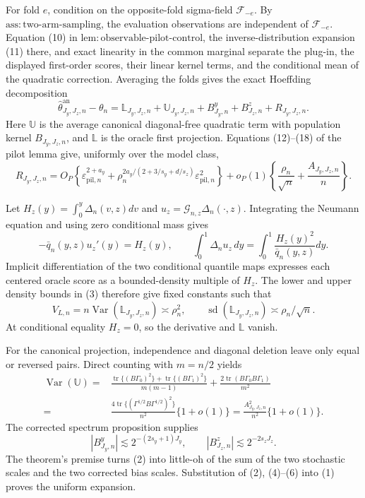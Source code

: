 For fold \(e\), condition on the opposite-fold sigma-field \(\mathscr F_{-e}\). By \(\mathrm{ass{:}two\text{-}arm\text{-}sampling}\), the evaluation observations are independent of \(\mathscr F_{-e}\). Equation (10) in \(\mathrm{lem{:}observable\text{-}pilot\text{-}control}\), the inverse-distribution expansion (11) there, and exact linearity in the common marginal separate the plug-in, the displayed first-order scores, their linear kernel terms, and the conditional mean of the quadratic correction. Averaging the folds gives the exact Hoeffding decomposition
\[
\widehat\theta^{\mathrm{an}}_{J_y,J_z,n}-\theta_n
=\mathbb L_{J_y,J_z,n}+\mathbb U_{J_y,J_z,n}
+B^y_{J_y,n}+B^z_{J_z,n}+R_{J_y,J_z,n}.                          \tag{1}
\]
Here \(\mathbb U\) is the average canonical diagonal-free quadratic term with population kernel \(B_{J_y,J_z,n}\), and \(\mathbb L\) is the oracle first projection. Equations (12)--(18) of the pilot lemma give, uniformly over the model class,
\[
R_{J_y,J_z,n}
=O_P\!\left\{\varepsilon_{\mathrm{pil},n}^{2+a_y}
+\rho_n^{2a_y/(2+3/s_y+d/s_z)}\varepsilon_{\mathrm{pil},n}^2\right\}
+o_P(1)\left\{\frac{\rho_n}{\sqrt n}+\frac{A_{J_y,J_z,n}}n\right\}. \tag{2}
\]

Let \(H_z(y)=\int_0^y\Delta_n(v,z)dv\) and \(u_z=\mathcal G_{n,z}\Delta_n(\cdot,z)\). Integrating the Neumann equation and using zero conditional mass gives
\[
-\bar q_n(y,z)u_z'(y)=H_z(y),
\qquad
\int_0^1\Delta_nu_z\,dy=\int_0^1\frac{H_z(y)^2}{\bar q_n(y,z)}dy. \tag{3}
\]
Implicit differentiation of the two conditional quantile maps expresses each centered oracle score as a bounded-density multiple of \(H_z\). The lower and upper density bounds in (3) therefore give fixed constants such that
\[
V_{L,n}=n\operatorname{Var}(\mathbb L_{J_y,J_z,n})\asymp\rho_n^2,
\qquad
\operatorname{sd}(\mathbb L_{J_y,J_z,n})\asymp\rho_n/\sqrt n.   \tag{4}
\]
At conditional equality \(H_z=0\), so the derivative and \(\mathbb L\) vanish.

For the canonical projection, independence and diagonal deletion leave only equal or reversed pairs. Direct counting with \(m=n/2\) yields
\[
\begin{split}
\operatorname{Var}(\mathbb U)
={}&\frac{\operatorname{tr}\{(B\Gamma_0)^2\}+\operatorname{tr}\{(B\Gamma_1)^2\}}{m(m-1)}
+\frac{2\operatorname{tr}(B\Gamma_0B\Gamma_1)}{m^2}\\
={}&\frac{4\operatorname{tr}\{(\Gamma^{1/2}B\Gamma^{1/2})^2\}}{n^2}\{1+o(1)\}
=\frac{A_{J_y,J_z,n}^2}{n^2}\{1+o(1)\}.                         \tag{5}
\end{split}
\]
The corrected spectrum proposition supplies
\[
|B^y_{J_y,n}|\lesssim2^{-(2s_y+1)J_y},
\qquad |B^z_{J_z,n}|\lesssim2^{-2s_zJ_z}.                         \tag{6}
\]
The theorem's premise turns (2) into little-oh of the sum of the two stochastic scales and the two corrected bias scales. Substitution of (2), (4)--(6) into (1) proves the uniform expansion.

